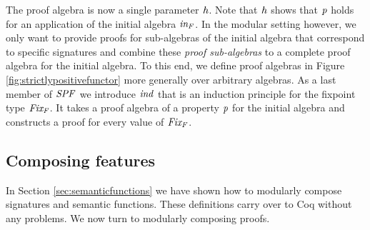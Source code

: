 The proof algebra is now a single parameter \ensuremath{\Varid{h}}. Note that \ensuremath{\Varid{h}} shows
that \ensuremath{\Varid{p}} holds for an application of the initial algebra \ensuremath{\Varid{in_{F}}}. In
the modular setting however, we only want to provide proofs for
sub-algebras of the initial algebra that correspond to specific
signatures and combine these \emph{proof sub-algebras} to a complete
proof algebra for the initial algebra. To this end, we define proof
algebras in Figure \ref{fig:strictlypositivefunctor} more generally
over arbitrary algebras. As a last member of \ensuremath{\Conid{SPF}} we introduce \ensuremath{\Varid{ind}}
that is an induction principle for the fixpoint type \ensuremath{\Varid{Fix_{F}}}. It takes a
proof algebra of a property \ensuremath{\Varid{p}} for the initial algebra and constructs
a proof for every value of \ensuremath{\Varid{Fix_{F}}}.


\subsection{Composing features}

In Section \ref{sec:semanticfunctions} we have shown how to modularly
compose signatures and semantic functions. These definitions carry
over to Coq without any problems. We now turn to modularly composing
proofs.

